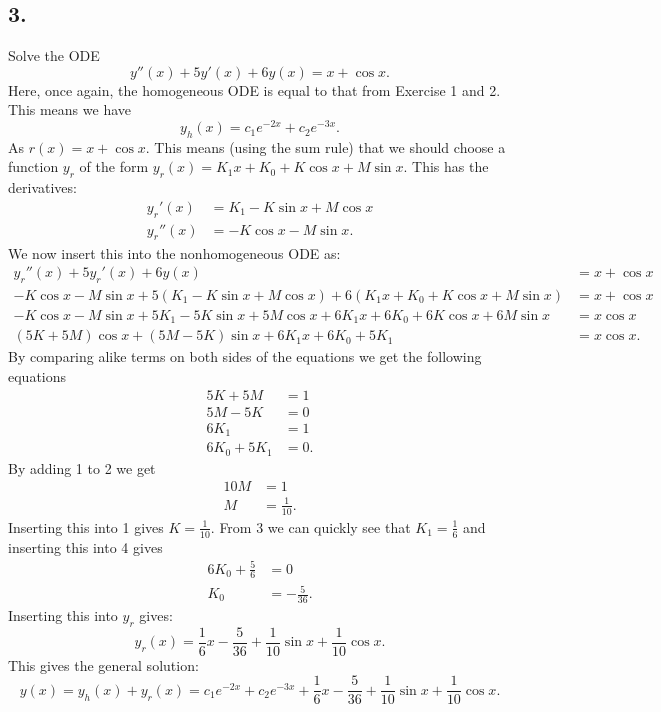 \subsection*{3.} Solve the ODE
\[ 
y''(x) + 5y'(x) + 6y(x) = x + \cos x
.\]
\bigbreak
Here, once again, the homogeneous ODE is equal to that from Exercise 1 and 2. This means we have
\[ 
y_h(x) = c_1 e^{-2x} + c_2 e^{-3x}
.\]
As $r(x) = x + \cos x$. This means (using the sum rule) that we should choose a function $y_r$ of the form $y_r(x) = K_1 x + K_0 + K \cos x + M \sin x$. This has the derivatives:
\begin{align*}
  y_r'(x) &= K_1 - K \sin x + M \cos x \\
  y_r''(x) &= - K \cos x - M \sin x
.\end{align*}
We now insert this into the nonhomogeneous ODE as:
\begin{align*}
  y_r''(x) + 5y_r'(x) + 6y(x) &= x + \cos x \\
  - K \cos x - M \sin x + 5 \left( K_1 - K \sin x + M \cos x \right) + 6 \left( K_1 x + K_0 + K \cos x + M \sin x \right) &= x + \cos x \\
  - K \cos x - M \sin x + 5K_1 - 5K \sin x + 5M \cos x + 6K_1 x + 6 K_0 + 6K \cos x + 6 M \sin x &= x \cos x \\
  (5K + 5M)\cos x + (5M - 5K)\sin x + 6 K_1 x + 6 K_0 + 5 K_1 &= x \cos x
.\end{align*}
By comparing alike terms on both sides of the equations we get the following equations
\begin{align*}
  5 K + 5 M &= 1 \\
  5 M - 5 K &= 0 \\
  6 K_1 &= 1 \\
  6 K_0 + 5 K_1 &= 0
.\end{align*}
By adding 1 to 2 we get
\begin{align*}
  10 M &= 1 \\
  M &= \frac{1}{10}
.\end{align*}
Inserting this into 1 gives $K = \frac{1}{10}$. From 3 we can quickly see that $K_1 = \frac{1}{6}$ and inserting this into 4 gives
\begin{align*}
  6 K_0 + \frac{5}{6} &= 0 \\
  K_0 &= -\frac{5}{36}
.\end{align*}
Inserting this into $y_r$ gives:
\[
  y_r(x) = \frac{1}{6} x - \frac{5}{36} + \frac{1}{10} \sin x + \frac{1}{10} \cos x
.\]
This gives the general solution:
\[ 
y(x) = y_h(x) + y_r(x) = c_1 e^{-2x} + c_2 e^{-3x} + \frac{1}{6}x - \frac{5}{36} + \frac{1}{10} \sin x + \frac{1}{10} \cos x
.\]



